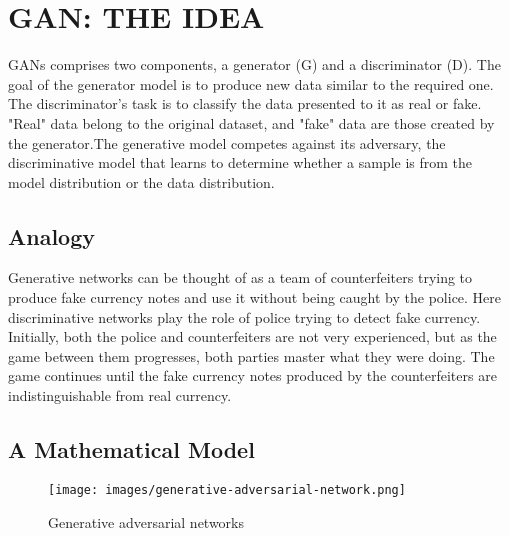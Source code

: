 \chapter{GAN: THE IDEA}
\begin{onehalfspace}
    GANs comprises two components, a generator (G) and a discriminator (D). 
    The goal of the generator model is to produce new data similar to the required 
    one. The discriminator's task is to classify the data presented to it as real or 
    fake. "Real" data belong to the original dataset, and "fake" data are those 
    created by the generator.The generative model competes against its adversary, 
    the discriminative model that learns to determine whether a sample is from the 
    model distribution or the data distribution.    
\section{Analogy}
    Generative networks can be thought of as a team of counterfeiters trying 
    to produce fake currency notes and use it without being caught by the 
    police. Here discriminative networks play the role of police trying to 
    detect fake currency. Initially, both the police and counterfeiters are not 
    very experienced, but as the game between them progresses, both parties 
    master what they were doing.  The game continues until the fake currency 
    notes produced by the counterfeiters are indistinguishable from real 
    currency.

\section{A Mathematical Model}

    
    \begin{figure}[h]
        \caption{Generative adversarial networks \cite{gan_image}}
        \centering
        \texttt{[image: images/generative-adversarial-network.png]}
    \end{figure} 


\end{onehalfspace}

